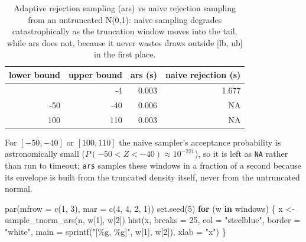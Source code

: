 \documentclass[
  letterpaper,
  DIV=11,
  numbers=noendperiod]{scrreprt}
\newenvironment{Shaded}{\begin{snugshade}}{\end{snugshade}}
\newcommand{\AttributeTok}[1]{\textcolor[rgb]{0.40,0.45,0.13}{#1}}
\newcommand{\ControlFlowTok}[1]{\textcolor[rgb]{0.00,0.23,0.31}{\textbf{#1}}}
\newcommand{\DecValTok}[1]{\textcolor[rgb]{0.68,0.00,0.00}{#1}}
\newcommand{\FunctionTok}[1]{\textcolor[rgb]{0.28,0.35,0.67}{#1}}
\newcommand{\NormalTok}[1]{\textcolor[rgb]{0.00,0.23,0.31}{#1}}
\newcommand{\OtherTok}[1]{\textcolor[rgb]{0.00,0.23,0.31}{#1}}
\newcommand{\StringTok}[1]{\textcolor[rgb]{0.13,0.47,0.30}{#1}}
\begin{document}
{

\begin{longtable}[]{@{}rrrr@{}}

\caption{\label{tbl-ars-timing}Adaptive rejection sampling (ars) vs
naive rejection sampling from an untruncated N(0,1): naive sampling
degrades catastrophically as the truncation window moves into the tail,
while ars does not, because it never wastes draws outside {[}lb, ub{]}
in the first place.}

\tabularnewline

\toprule\noalign{}
lower bound & upper bound & ars (s) & naive rejection (s) \\
\midrule\noalign{}
\endhead
\bottomrule\noalign{}
\endlastfoot
-5 & -4 & 0.003 & 1.677 \\
-50 & -40 & 0.006 & NA \\
100 & 110 & 0.003 & NA \\

\end{longtable}

}

For \([-50,-40]\) or \([100,110]\) the naive sampler's acceptance
probability is astronomically small
(\(P(-50<Z<-40) \approx 10^{-221}\)), so it is left as \texttt{NA}
rather than run to timeout; \texttt{ars} samples these windows in a
fraction of a second because its envelope is built from the truncated
density itself, never from the untruncated normal.

\begin{Shaded}
\begin{Highlighting}[]
\FunctionTok{par}\NormalTok{(}\AttributeTok{mfrow =} \FunctionTok{c}\NormalTok{(}\DecValTok{1}\NormalTok{, }\DecValTok{3}\NormalTok{), }\AttributeTok{mar =} \FunctionTok{c}\NormalTok{(}\DecValTok{4}\NormalTok{, }\DecValTok{4}\NormalTok{, }\DecValTok{2}\NormalTok{, }\DecValTok{1}\NormalTok{))}
\FunctionTok{set.seed}\NormalTok{(}\DecValTok{5}\NormalTok{)}
\ControlFlowTok{for}\NormalTok{ (w }\ControlFlowTok{in}\NormalTok{ windows) \{}
\NormalTok{    x }\OtherTok{\textless{}{-}} \FunctionTok{sample\_tnorm\_ars}\NormalTok{(n, w[}\DecValTok{1}\NormalTok{], w[}\DecValTok{2}\NormalTok{])}
    \FunctionTok{hist}\NormalTok{(x, }\AttributeTok{breaks =} \DecValTok{25}\NormalTok{, }\AttributeTok{col =} \StringTok{"steelblue"}\NormalTok{, }\AttributeTok{border =} \StringTok{"white"}\NormalTok{,}
         \AttributeTok{main =} \FunctionTok{sprintf}\NormalTok{(}\StringTok{"[\%g, \%g]"}\NormalTok{, w[}\DecValTok{1}\NormalTok{], w[}\DecValTok{2}\NormalTok{]), }\AttributeTok{xlab =} \StringTok{"x"}\NormalTok{)}
\NormalTok{\}}
\end{Highlighting}
\end{Shaded}
\end{document}
